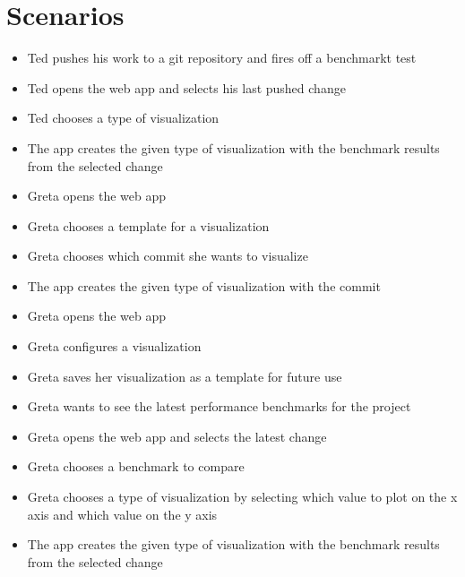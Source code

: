 \section{Scenarios}

\begin{itemize}
	\item Ted pushes his work to a git repository and fires off a benchmarkt test
	\item Ted opens the web app and selects his last pushed change
	\item Ted chooses a type of visualization
	\item The app creates the given type of visualization with the benchmark results from the selected change
\end{itemize}

\begin{itemize}
	\item Greta opens the web app
	\item Greta chooses a \gls{template} for a visualization
	\item Greta chooses which commit she wants to visualize
	\item The app creates the given type of visualization with the commit
\end{itemize}

\begin{itemize}
	\item Greta opens the web app
	\item Greta configures a visualization
	\item Greta saves her visualization as a \gls{template} for future use
\end{itemize}

\begin{itemize}
	\item Greta wants to see the latest performance benchmarks for the project
	\item Greta opens the web app and selects the latest change
	\item Greta chooses a benchmark to compare
	\item Greta chooses a type of visualization by selecting which value to plot on the x axis and which value on the y axis
	\item The app creates the given type of visualization with the benchmark results from the selected change
\end{itemize}

